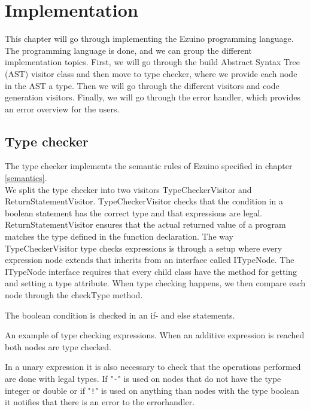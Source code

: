 \chapter{Implementation}
This chapter will go through implementing the Ezuino programming language. The programming language is done, and we can group the different implementation topics. First, we will go through the build Abstract Syntax Tree (AST) visitor class and then move to type checker, where we provide each node in the AST a type. Then we will go through the different visitors and code generation visitors. Finally, we will go through the error handler, which provides an error overview for the users.
\section{Type checker}
The type checker implements the semantic rules of Ezuino specified in chapter \ref{semantics}. \\
We split the type checker into two visitors TypeCheckerVisitor and ReturnStatementVisitor. TypeCheckerVisitor checks that the condition in a boolean statement has the correct type and that expressions are legal. ReturnStatementVisitor ensures that the actual returned value of a program matches the type defined in the function declaration.
The way TypeCheckerVisitor type checks expressions is through a setup where every expression node extends that inherits from an interface called ITypeNode. The ITypeNode interface requires that every child class have the method for getting and setting a type attribute. When type checking happens, we then compare each node through the checkType method.

\noindent\newline

The boolean condition is checked in an if- and else statements.

\noindent\newline

An example of type checking expressions. When an additive expression is reached both nodes are type checked.

\noindent\newline

In a unary expression it is also necessary to check that the operations performed are done with legal types. If "\texttt{-}" is used on nodes that do not have the type integer or double or if "\texttt{!}" is used on anything than nodes with the type boolean it notifies that there is an error to the errorhandler.   

\noindent\newline

